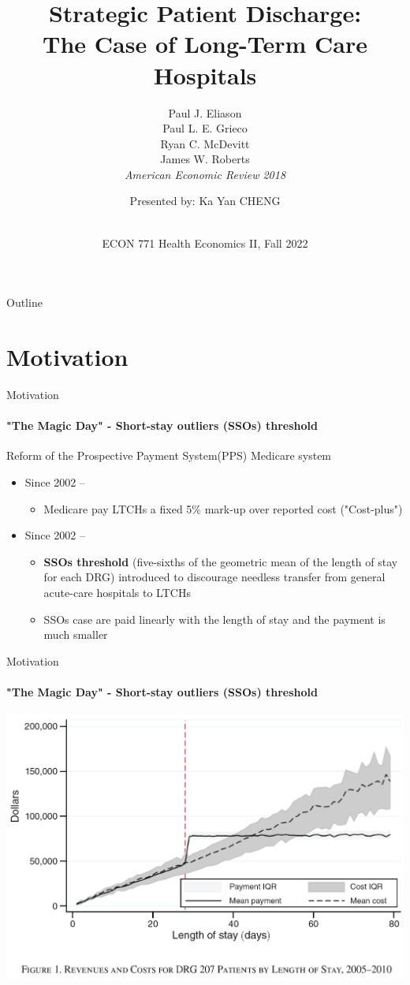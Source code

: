 \documentclass{beamer}
\title{Strategic Patient Discharge:\\ The Case of Long-Term Care Hospitals}
\subtitle{Paul J. Eliason\\ Paul L. E. Grieco\\ Ryan C. McDevitt\\ James W. Roberts\\ \textit{American Economic Review 2018}}
\author{Presented by: Ka Yan CHENG}
\date{ \vspace*{-1cm}\\ ECON 771 Health Economics II, Fall 2022}
\begin{document}
\begin{frame}
    \titlepage 
\end{frame}

\logo{}


\begin{frame}{Outline}
    \tableofcontents
\end{frame}


\section{Motivation}

\begin{frame}{Motivation}
\framesubtitle{"The Magic Day" - Short-stay outliers (SSOs) threshold}
Reform of the Prospective Payment System(PPS) Medicare system
\begin{itemize}
	\item Since 2002 -- \\
			\begin{itemize}
				\item Medicare pay LTCHs a fixed 5\% mark-up over reported cost ("Cost-plus")
				\end{itemize}
	\item Since 2002 -- \\
			\begin{itemize}
			\item \textbf{SSOs threshold} (five-sixths of the geometric mean of the length of stay for each DRG) introduced to discourage needless transfer from general acute-care hospitals to LTCHs
			\item SSOs case are paid linearly with the length of stay and the payment is much smaller
			\end{itemize}
\end{itemize}


\end{frame}


\begin{frame}{Motivation}
\framesubtitle{"The Magic Day" - Short-stay outliers (SSOs) threshold}
\includegraphics[width=\textwidth]{Rev_Cost_DRG207}

\end{frame}
\end{document}
